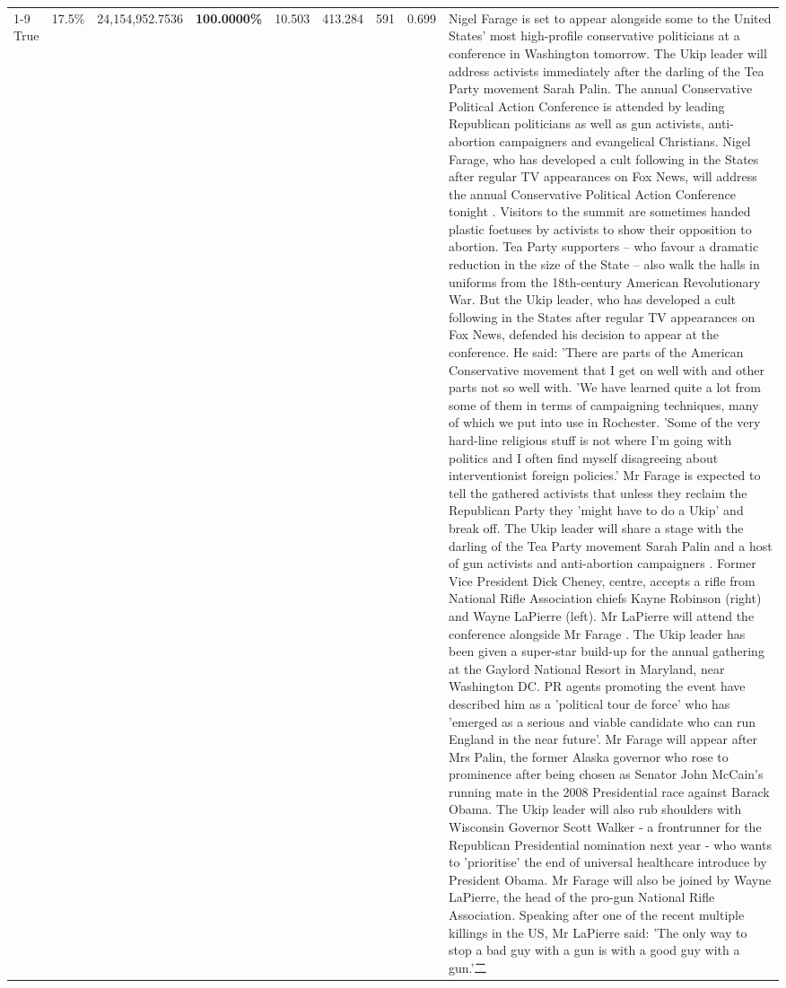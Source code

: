 \begin{table}[H]
\begin{tabular}{lllrlllll}
\cline{1-9}
True & 17.5\% & 24,154,952.7536 & \bfseries \color{red} 100.0000\% & 10.503 & 413.284 & 591 & 0.699 & Nigel Farage is set to appear alongside some to the United States' most high-profile conservative politicians at a conference in Washington tomorrow. The Ukip leader will address activists immediately after the darling of the Tea Party movement Sarah Palin. The annual Conservative Political Action Conference is attended by leading Republican politicians as well as gun activists, anti-abortion campaigners and evangelical Christians. Nigel Farage, who has developed a cult following in the States after regular TV appearances on Fox News, will address the annual Conservative Political Action Conference tonight . Visitors to the summit are sometimes handed plastic foetuses by activists to show their opposition to abortion. Tea Party supporters – who favour a dramatic reduction in the size of the State – also walk the halls in uniforms from the 18th-century American Revolutionary War. But the Ukip leader, who has developed a cult following in the States after regular TV appearances on Fox News, defended his decision to appear at the conference. He said: 'There are parts of the American Conservative movement that I get on well with and other parts not so well with. 'We have learned quite a lot from some of them in terms of campaigning techniques, many of which we put into use in Rochester. 'Some of the very hard-line religious stuff is not where I'm going with politics and I often find myself disagreeing about interventionist foreign policies.' Mr Farage is expected to tell the gathered activists that unless they reclaim the Republican Party they 'might have to do a Ukip' and break off. The Ukip leader will share a stage with the darling of the Tea Party movement Sarah Palin and a host of gun activists and anti-abortion campaigners . Former Vice President Dick Cheney, centre, accepts a rifle from National Rifle Association chiefs Kayne Robinson (right) and Wayne LaPierre (left). Mr LaPierre will attend the conference alongside Mr Farage . The Ukip leader has been given a super-star build-up for the annual gathering at the Gaylord National Resort in Maryland, near Washington DC. PR agents promoting the event have described him as a 'political tour de force' who has 'emerged as a serious and viable candidate who can run England in the near future'. Mr Farage will appear after Mrs Palin, the former Alaska governor who rose to prominence after being chosen as Senator John McCain's running mate in the 2008 Presidential race against Barack Obama. The Ukip leader will also rub shoulders with Wisconsin Governor Scott Walker - a frontrunner for the Republican Presidential nomination next year - who wants to 'prioritise' the end of universal healthcare introduce by President Obama. Mr Farage will also be joined by Wayne LaPierre, the head of the pro-gun National Rifle Association. Speaking after one of the recent multiple killings in the US, Mr LaPierre said: 'The only way to stop a bad guy with a gun is with a good guy with a gun.'二 \\

\end{tabular}
\end{table}
